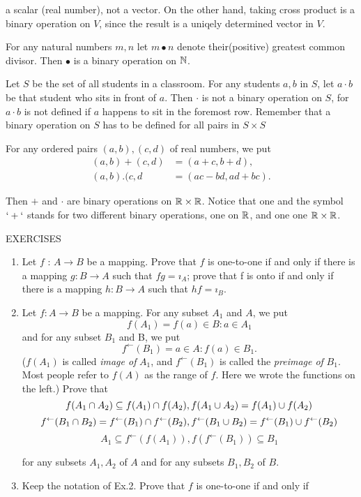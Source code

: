 \documentclass[11pt]{amsbook}
\begin{document}
a scalar (real number), not a vector. On the other hand, taking cross product is a binary operation on $V$, since the result is a uniqely determined vector in $V$.

\begin{hEnumerateAlpha}
\item
For any natural numbers $m,n$ let  $m \bullet n$ denote their(positive) greatest common divisor. Then $\bullet$ is a binary operation on $\mathbb{N}$.
\item
Let $S$ be the set of all students in a classroom. For any students $a,b$ in $S$, let $a\cdot b$ be that student who sits in front of $a$. Then $\cdot$ is not a 
binary operation on $S$, for $a\cdot b$ is not defined if $a$ happens to sit in the foremost row. Remember that a binary operation on $S$ has to be defined for all 
pairs in $S\times S$
\item
For any ordered pairs $(a,b),(c,d)$ of real numbers, we put 
  \begin{align*}
    (a,b)+(c,d)  &= (a+c,b+d), \\
    (a,b).(c,d   &=(ac-bd,ad+bc).
  \end{align*}


Then $+$ and $\cdot$ are binary operations on $\mathbb{R} \times \mathbb{R}$. Notice that one and the symbol $`+`$ stands for two different binary operations, one on $\mathbb{R}$,
and one one $\mathbb{R} \times \mathbb{R}$. 
\end{hEnumerateAlpha}
\begin{center}
EXERCISES
\end{center}


  \begin{enumerate}

  \item 
  Let $f$ : $ A   \to B$ be a mapping. Prove that $f$ is one-to-one if and only if there is a mapping $g:B \to A $ such that $ f g = ı_A $; prove that f is 
  onto if and only if there is a mapping $h:B \to A$ such that $hf = ı_B$.
  \item
  Let $f:A \to B$ be a mapping. For any subset $A_1$ and $A$, we put 
  $$ f(A_1) = {f(a)\in B : a \in A_1} $$
  and for any subset $B_1$ and B, we put 
  $$ f^\leftarrow (B_1) = {a \in A : f(a) \in B_1}.$$
  ($f(A_1)$ is called \emph{image of} $A_1$, and $f^\leftarrow (B_1)$ is called the     \emph{preimage of} $B_1$. Most people refer to $f(A)$ as the range of $f$. Here 
    we wrote the functions on the left.) Prove that
    \[
          f(A_1 \cap A_2) \subseteq f(A_1) \cap f(A_2), 
          f(A_1 \cup A_2) =f(A_1) \cup f(A_2) 
    \]
    \[
          f^\leftarrow(B_1 \cap B_2) = f^\leftarrow(B_1) \cap f^\leftarrow(B_2), f^\leftarrow(B_1 \cup B_2) = f^\leftarrow(B_1) \cup f^\leftarrow(B_2) 
    \]
    \[
          A_1 \subseteq f^\leftarrow(f(A_1)), f(f^\leftarrow(B_1)) \subseteq B_1
    \]
    
    for any subsets $A_1,A_2$ of $A$ and for any subsets $B_1, B_2$ of $B$.
    \item
    Keep the notation of Ex.2. Prove that $f$ is one-to-one if and only if
  \end{enumerate}
\end{document}

